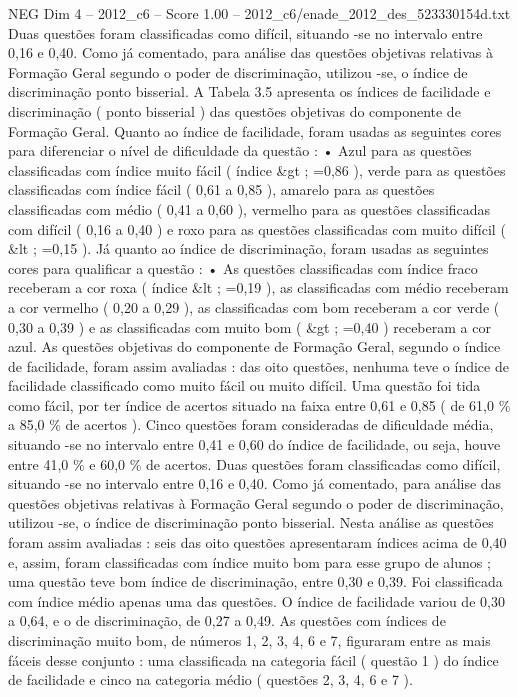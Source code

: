 \begin{textsample}{NEG Dim 4 – 2012\_c6 – Score 1.00 – 2012\_c6/enade\_2012\_des\_523330154d.txt}
Duas questões foram classificadas como difícil, situando -se no intervalo entre 0,16 e 0,40.
Como já comentado, para análise das questões objetivas relativas à Formação Geral segundo o poder de discriminação, utilizou -se, o índice de discriminação ponto bisserial.
A Tabela 3.5 apresenta os índices de facilidade e discriminação ( ponto bisserial ) das questões objetivas do componente de Formação Geral.
Quanto ao índice de facilidade, foram usadas as seguintes cores para diferenciar o nível de dificuldade da questão : • Azul para as questões classificadas com índice muito fácil ( índice \&gt ; =0,86 ), verde para as questões classificadas com índice fácil ( 0,61 a 0,85 ), amarelo para as questões classificadas com médio ( 0,41 a 0,60 ), vermelho para as questões classificadas com difícil ( 0,16 a 0,40 ) e roxo para as questões classificadas com muito difícil ( \&lt ; =0,15 ).
Já quanto ao índice de discriminação, foram usadas as seguintes cores para qualificar a questão : • As questões classificadas com índice fraco receberam a cor roxa ( índice \&lt ; =0,19 ), as classificadas com médio receberam a cor vermelho ( 0,20 a 0,29 ), as classificadas com bom receberam a cor verde ( 0,30 a 0,39 ) e as classificadas com muito bom ( \&gt ; =0,40 ) receberam a cor azul.
As questões objetivas do componente de Formação Geral, segundo o índice de facilidade, foram assim avaliadas : das oito questões, nenhuma teve o índice de facilidade classificado como muito fácil ou muito difícil.
Uma questão foi tida como fácil, por ter índice de acertos situado na faixa entre 0,61 e 0,85 ( de 61,0 \% a 85,0 \% de acertos ).
Cinco questões foram consideradas de dificuldade média, situando -se no intervalo entre 0,41 e 0,60 do índice de facilidade, ou seja, houve entre 41,0 \% e 60,0 \% de acertos.
Duas questões foram classificadas como difícil, situando -se no intervalo entre 0,16 e 0,40.
Como já comentado, para análise das questões objetivas relativas à Formação Geral segundo o poder de discriminação, utilizou -se, o índice de discriminação ponto bisserial.
Nesta análise as questões foram assim avaliadas : seis das oito questões apresentaram índices acima de 0,40 e, assim, foram classificadas com índice muito bom para esse grupo de alunos ; uma questão teve bom índice de discriminação, entre 0,30 e 0,39.
Foi classificada com índice médio apenas uma das questões.
O índice de facilidade variou de 0,30 a 0,64, e o de discriminação, de 0,27 a 0,49.
As questões com índices de discriminação muito bom, de números 1, 2, 3, 4, 6 e 7, figuraram entre as mais fáceis desse conjunto : uma classificada na categoria fácil ( questão 1 ) do índice de facilidade e cinco na categoria médio ( questões 2, 3, 4, 6 e 7 ).

\end{textsample}
